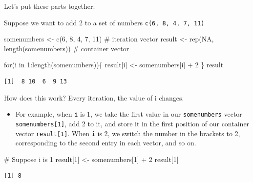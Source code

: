 \documentclass[
  letterpaper,
  DIV=11,
  numbers=noendperiod]{scrreprt}
\newenvironment{Shaded}{\begin{snugshade}}{\end{snugshade}}
\newcommand{\CommentTok}[1]{\textcolor[rgb]{0.37,0.37,0.37}{#1}}
\newcommand{\ConstantTok}[1]{\textcolor[rgb]{0.56,0.35,0.01}{#1}}
\newcommand{\ControlFlowTok}[1]{\textcolor[rgb]{0.00,0.23,0.31}{#1}}
\newcommand{\DecValTok}[1]{\textcolor[rgb]{0.68,0.00,0.00}{#1}}
\newcommand{\FunctionTok}[1]{\textcolor[rgb]{0.28,0.35,0.67}{#1}}
\newcommand{\NormalTok}[1]{\textcolor[rgb]{0.00,0.23,0.31}{#1}}
\newcommand{\OtherTok}[1]{\textcolor[rgb]{0.00,0.23,0.31}{#1}}
\newcommand{\SpecialCharTok}[1]{\textcolor[rgb]{0.37,0.37,0.37}{#1}}
\providecommand{\tightlist}{%
  \setlength{\itemsep}{0pt}\setlength{\parskip}{0pt}}\usepackage{longtable,booktabs,array}
\begin{document}
Let's put these parts together:

Suppose we want to add 2 to a set of numbers
\texttt{c(6,\ 8,\ 4,\ 7,\ 11)}

\begin{Shaded}
\begin{Highlighting}[]
\NormalTok{somenumbers }\OtherTok{\textless{}{-}} \FunctionTok{c}\NormalTok{(}\DecValTok{6}\NormalTok{, }\DecValTok{8}\NormalTok{, }\DecValTok{4}\NormalTok{, }\DecValTok{7}\NormalTok{, }\DecValTok{11}\NormalTok{) }\CommentTok{\# iteration vector}
\NormalTok{result }\OtherTok{\textless{}{-}} \FunctionTok{rep}\NormalTok{(}\ConstantTok{NA}\NormalTok{, }\FunctionTok{length}\NormalTok{(somenumbers)) }\CommentTok{\# container vector}

\ControlFlowTok{for}\NormalTok{(i }\ControlFlowTok{in} \DecValTok{1}\SpecialCharTok{:}\FunctionTok{length}\NormalTok{(somenumbers))\{}
\NormalTok{  result[i] }\OtherTok{\textless{}{-}}\NormalTok{ somenumbers[i] }\SpecialCharTok{+} \DecValTok{2}
\NormalTok{\}}
\NormalTok{result}
\end{Highlighting}
\end{Shaded}

\begin{verbatim}
[1]  8 10  6  9 13
\end{verbatim}

How does this work? Every iteration, the value of i changes.

\begin{itemize}
\tightlist
\item
  For example, when \texttt{i} is 1, we take the first value in our
  \texttt{somenumbers} vector \texttt{somenumbers{[}1{]}}, add 2 to it,
  and store it in the first position of our container vector
  \texttt{result{[}1{]}}. When \texttt{i} is 2, we switch the number in
  the brackets to 2, corresponding to the second entry in each vector,
  and so on.
\end{itemize}

\begin{Shaded}
\begin{Highlighting}[]
\CommentTok{\# Suppose i is 1}
\NormalTok{result[}\DecValTok{1}\NormalTok{] }\OtherTok{\textless{}{-}}\NormalTok{ somenumbers[}\DecValTok{1}\NormalTok{] }\SpecialCharTok{+} \DecValTok{2}
\NormalTok{result[}\DecValTok{1}\NormalTok{]}
\end{Highlighting}
\end{Shaded}

\begin{verbatim}
[1] 8
\end{verbatim}
\end{document}
